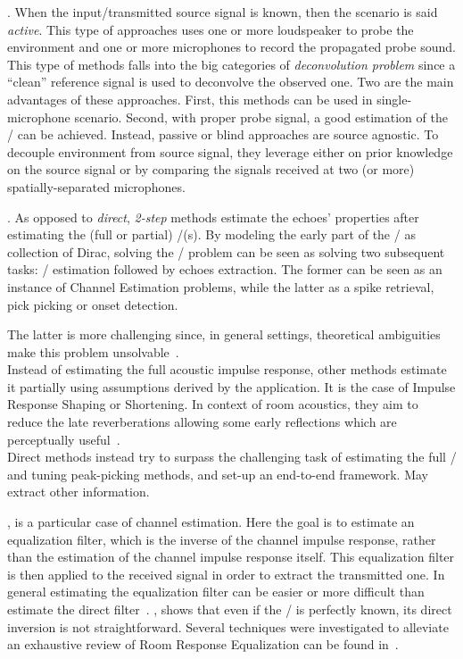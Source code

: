 .
When the input/transmitted source signal is known, then the scenario is said \textit{active}.
This type of approaches uses one or more loudspeaker to probe the environment and one or more microphones to record the propagated probe sound.
This type of methods falls into the big categories of \textit{deconvolution problem} since a ``clean'' reference signal is used to deconvolve the observed one.
Two are the main advantages of these approaches. First, this methods can be used in single-microphone scenario.
Second, with proper probe signal, a good estimation of the \RIR/ can be achieved.
Instead, passive or blind approaches are source agnostic.
To decouple environment from source signal, they leverage either on prior knowledge on the source signal or by comparing the signals received at two (or more) spatially-separated microphones.

.
As opposed to \textit{direct}, \textit{2-step} methods estimate the echoes' properties after estimating the (full or partial) \RIR/(s).
By modeling the early part of the \RIR/ as collection of Dirac, solving the \AER/ problem can be seen as solving two subsequent tasks:
\RIR/ estimation followed by echoes extraction.
The former can be seen as an instance of Channel Estimation problems, while the latter as a spike retrieval, pick picking or onset detection.

The latter is more challenging since, in general settings, theoretical ambiguities make this problem unsolvable~.
\\Instead of estimating the full acoustic impulse response, other methods estimate it partially using assumptions derived by the application.
It is the case of Impulse Response Shaping or Shortening.
In context of room acoustics, they aim to reduce the late reverberations allowing some early reflections which are perceptually useful~.
\\Direct methods instead try to surpass the challenging task of estimating the full \RIR/ and tuning peak-picking methods, and set-up an end-to-end framework.
May extract other information.



, is a particular case of channel estimation.
Here the goal is to estimate an equalization filter, which is the inverse of the channel impulse response, rather than the estimation of the channel impulse response itself.
This equalization filter is then applied to the received signal in order to extract the transmitted one.
In general estimating the equalization filter can be easier or more difficult than estimate the direct filter~.
, shows that even if the \RIR/ is perfectly known, its direct inversion is not straightforward.
Several techniques were investigated to alleviate an exhaustive review of Room Response Equalization can be found in~.


